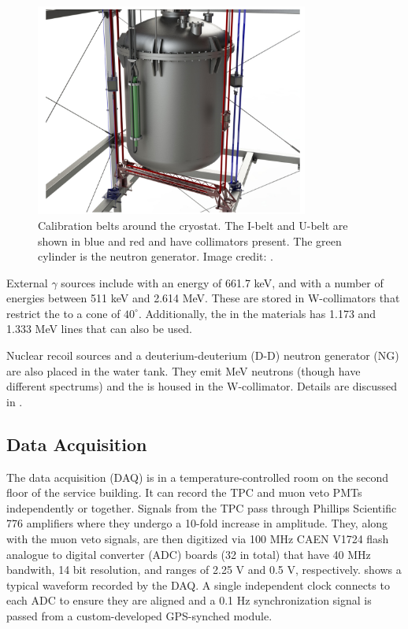 \begin{figure}
\centering
\includegraphics[width=0.8\textwidth]{TPCCalibrations}
\caption{Calibration belts around the cryostat.  The I-belt and U-belt are shown in blue and red and have collimators present.  The green
cylinder is the neutron generator.  Image credit: .}
\label{fig:xenon1t_calibrations_belts}
\end{figure}

External $\gamma$ sources include  with an energy of 661.7 keV, and  with a number of energies between 511 keV
and 2.614 MeV.  These are stored in W-collimators that restrict the \gammarays to a cone of $40^{\circ}$.  Additionally, the 
in the materials has 1.173 and 1.333 MeV lines that can also be used.

Nuclear recoil sources \ambe and a deuterium-deuterium (D-D) neutron generator (NG) are also placed in the water tank.  They emit MeV
neutrons (though have different spectrums) and the \ambe is housed in the W-collimator.  Details are discussed in
.



\subsection{Data Acquisition}
\label{subsec:xenon1t_daq}
The data acquisition (DAQ) is in a temperature-controlled room on the second floor of the service building.  It can record the TPC and
muon veto PMTs independently or together.  Signals from the TPC pass through Phillips Scientific 776 amplifiers
where they undergo a 10-fold increase in amplitude.  They, along with the muon veto signals, are then digitized via 100 MHz CAEN V1724
flash analogue to digital converter (ADC) boards (32 in total) that have 40 MHz bandwith, 14 bit resolution, and ranges of 2.25 V and
0.5 V, respectively.  
shows a typical waveform recorded by the DAQ.  A single independent clock
connects to each ADC to ensure they are aligned and a 0.1 Hz synchronization signal is passed from a custom-developed GPS-synched
module.


